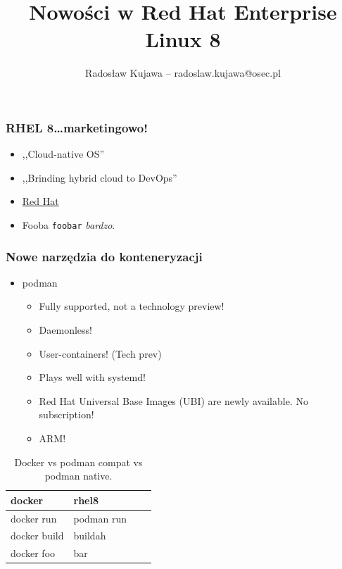 \documentclass[dvipsnames,table]{beamer}
\title{Nowości w Red Hat Enterprise Linux 8}
\author{Radosław Kujawa -- radoslaw.kujawa@osec.pl}
\institute{OSEC}
\begin{document}
\begin{frame}
	\titlepage
\end{frame}

\begin{frame}
\frametitle{RHEL 8\ldots marketingowo!}
\begin{itemize}
	\item ,,Cloud-native OS''
	\item ,,Brinding hybrid cloud to DevOps''
	\item \href{http://www.redhat.com}{Red Hat}
	\item Fooba {\tt foobar} {\em bardzo}.
\end{itemize}
\begin{center}
\end{center}
\end{frame}








%

\begin{frame}[fragile]
	\frametitle{Nowe narzędzia do konteneryzacji}
\begin{table}[]
\begin{itemize}
	\item podman
	\begin{itemize}
		\item Fully supported, not a technology preview!
		\item Daemonless!
		\item User-containers! (Tech prev)
		\item Plays well with systemd!
		\item Red Hat Universal Base Images (UBI) are newly available. No subscription!
		\item ARM!
	\end{itemize}
\end{itemize}
\centering
\caption{Docker vs podman compat vs podman native.}
\label{porownanie}
\scriptsize
\begin{tabular}{llll}
\hline
docker & rhel8    \\ \hline
docker run & podman run \\
docker build & buildah  \\
docker foo & bar \\ \hline
\end{tabular}
\normalsize
\end{table}
\end{frame}
\end{document}
